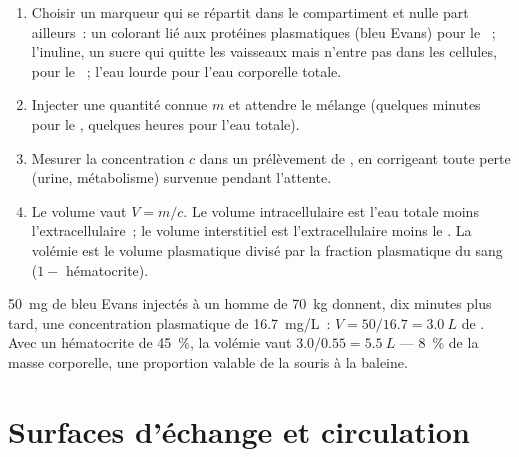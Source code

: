 \begin{method}\label{met:b1:mammal-organization:dilution}
\begin{enumerate}
  \item Choisir un marqueur qui se répartit dans le compartiment et
        nulle part ailleurs~: un colorant lié aux protéines
        plasmatiques (bleu Evans) pour le ~; l'inuline, un sucre
        qui quitte les vaisseaux mais n'entre pas dans les cellules,
        pour le ~; l'eau lourde pour l'eau
        corporelle totale.
  \item Injecter une quantité connue $m$ et attendre le mélange
        (quelques minutes pour le , quelques heures pour l'eau
        totale).
  \item Mesurer la concentration $c$ dans un prélèvement de , en
        corrigeant toute perte (urine, métabolisme) survenue pendant
        l'attente.
  \item Le volume vaut $V = m/c$. Le volume intracellulaire est l'eau
        totale moins l'extracellulaire~; le volume interstitiel est
        l'extracellulaire moins le . La volémie est le volume
        plasmatique divisé par la fraction plasmatique du sang
        ($1 - $ hématocrite).
\end{enumerate}
\end{method}

\begin{example}\label{ex:b1:mammal-organization:evansblue}
\qty{50}{mg} de bleu Evans injectés à un homme de \qty{70}{kg} donnent,
dix minutes plus tard, une concentration plasmatique de
\qty{16.7}{mg/L}~: $V = 50/16.7 = \qty{3.0}{L}$ de . Avec un
hématocrite de \qty{45}{\%}, la volémie vaut
$3.0/0.55 = \qty{5.5}{L}$ --- \qty{8}{\%} de la masse corporelle, une
proportion valable de la souris à la baleine.
\end{example}

\section{Surfaces d'échange et circulation}

